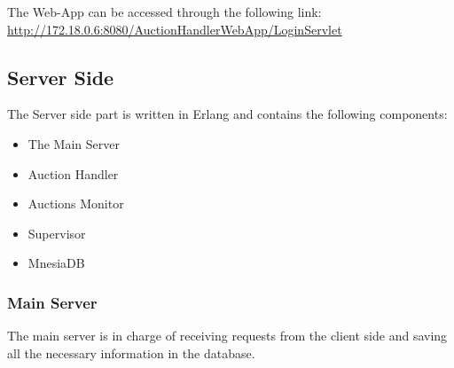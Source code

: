 The Web-App can be accessed through the following link: \\ \url{http://172.18.0.6:8080/AuctionHandlerWebApp/LoginServlet}

\subsection{Server Side}
\noindent The Server side part is written in Erlang and contains the following components:

\begin{itemize}
	\item The Main Server
	\item Auction Handler
	\item Auctions Monitor
	\item Supervisor
	\item MnesiaDB
\end{itemize}

\subsubsection{Main Server}
\noindent The main server is in charge of receiving requests from the client side and saving all the necessary information in the database.

